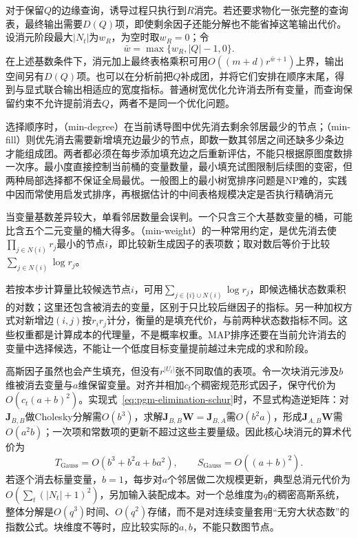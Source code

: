 对于保留$Q$的边缘查询，诱导过程只执行到$R$消完。若还要求物化一张完整的查询表，最终输出需要$D(Q)$项，即使剩余因子还能分解也不能省掉这笔输出代价。设消元阶段最大$|N_t|$为$w_R$，为空时取$w_R=0$；令
\[
  \bar w=\max\{w_R,|Q|-1,0\}.
\]
在上述基数条件下，消元加上最终表格乘积可用$O((m+d)r^{\bar w+1})$上界，输出空间另有$D(Q)$项。也可以在分析前把$Q$补成团，并将它们安排在顺序末尾，得到与显式联合输出相适应的宽度指标。普通树宽优化允许消去所有变量，而查询保留约束不允许提前消去$Q$，两者不是同一个优化问题。

选择顺序时，（min-degree）在当前诱导图中优先消去剩余邻居最少的节点；（min-fill）则优先消去需要新增填充边最少的节点，即数一数其邻居之间还缺多少条边才能组成团。两者都必须在每步添加填充边之后重新评估，不能只根据原图度数排一次序。最小度直接控制当前桶的变量数量，最小填充试图限制后续图的变密，但两种局部选择都不保证全局最优。一般图上的最小树宽排序问题是NP难的，实践中因而常使用启发式排序，再根据估计的中间表格规模决定是否执行精确消元

当变量基数差异较大，单看邻居数量会误判。一个只含三个大基数变量的桶，可能比含五个二元变量的桶大得多。（min-weight）的一种常用约定，是优先消去使$\prod_{j\in N(i)}r_j$最小的节点$i$，即比较新生成因子的表项数；取对数后等价于比较$\sum_{j\in N(i)}\log r_j$。

若按本步计算量比较候选节点$i$，可用$\sum_{j\in\{i\}\cup N(i)}\log r_j$，即候选桶状态数乘积的对数；这里还包含被消去的变量，区别于只比较后继因子的指标。另一种加权方式对新增边$(i,j)$按$r_ir_j$计分，衡量的是填充代价，与前两种状态数指标不同。这些权重都是计算成本的代理量，不是概率权重。MAP排序还要在当前允许消去的变量中选择候选，不能让一个低度目标变量提前越过未完成的求和阶段。

高斯因子虽然也会产生填充，但没有$r^{|U_t|}$张不同取值的表项。令一次块消元涉及$b$维被消去变量与$a$维保留变量。对齐并相加$c_t$个稠密规范形式因子，保守代价为$O(c_t(a+b)^2)$。实现式~\eqref{eq:pgm-elimination-schur}时，不显式构造逆矩阵：对$\bm{J}_{B,B}$做Cholesky分解需$O(b^3)$，求解$\bm{J}_{B,B}\bm{W}=\bm{J}_{B,A}$需$O(b^2a)$，形成$\bm{J}_{A,B}\bm{W}$需$O(a^2b)$；一次项和常数项的更新不超过这些主要量级。因此核心块消元的算术代价为
\begin{equation}
  T_{\mathrm{Gauss}}
  =O(b^3+b^2a+ba^2),\qquad
  S_{\mathrm{Gauss}}=O((a+b)^2).
  \label{eq:pgm-elimination-gaussian-cost}
\end{equation}
若逐个消去标量变量，$b=1$，每步对$a$个邻居做二次规模更新，典型总消元代价为$O(\sum_t(|N_t|+1)^2)$，另加输入装配成本。对一个总维度为$q$的稠密高斯系统，整体分解是$O(q^3)$时间、$O(q^2)$存储，而不是对连续变量套用“无穷大状态数”的指数公式。块维度不等时，应比较实际的$a,b$，不能只数图节点。

